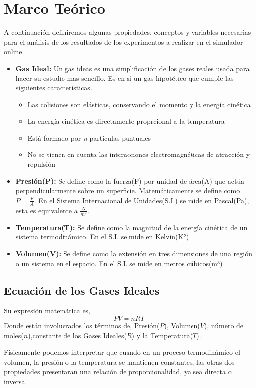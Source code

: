 \documentclass[../portafolio.tex]{subfiles}
\begin{document}
\section{Marco Teórico}

A continuación definiremos algunas propiedades, conceptos y variables necesarias para el análisis de los resultados de los experimentos a realizar en el simulador online.
\begin{itemize}
\item \textbf{Gas Ideal:} Un gas ideas es una simplificación de los gases reales usada para hacer su estudio mas sencillo. Es en sí un gas hipotético que cumple las siguientes características.
    \begin{itemize}
    \item Las colisiones son elásticas, conservando el momento y la energía cinética
    \item La energía cinética es directamente proprcional a la temperatura
    \item Está formado por \textit{n} partículas puntuales
    \item No se tienen en cuenta las interacciones electromagnéticas de atracción y repulsión
    \end{itemize}

	\item \textbf{Presión(P):} Se define como la fuerza(F) por unidad de área(A) que actúa perpendicularmente sobre un superficie. Matemáticamente se define como  $ P= \frac{F}{A} $. En el Sistema Internacional de Unidades(S.I.) se mide en Pascal(Pa), esta es equivalente a $\frac{N}{m^{2}}$.
	\item \textbf{Temperatura(T):} Se define como la magnitud de la energía cinética de un sistema termodinámico. En el S.I. se mide en Kelvin(K°)
        \item \textbf{Volumen(V):} Se define como la extensión en tres dimensiones de una región o un sistema en el espacio. En el S.I. se mide en metros cúbicos(m³)
\end{itemize}
\subsection*{Ecuación de los Gases Ideales}

Su expresión matemática es,
\begin{equation}
PV=nRT
\end{equation}
Donde están involucrados los términos de, Presión($P$), Volumen($V$), número de moles($n$),constante de los Gases Ideales($R$) y la Temperatura($T$).

Físicamente podemos interpretar que cuando en un proceso termodinámico el volumen, la presión o la temperatura se mantienen constantes, las otras dos propiedades presentaran una relación de proporcionalidad, ya sea directa o inversa. 
\end{document}
